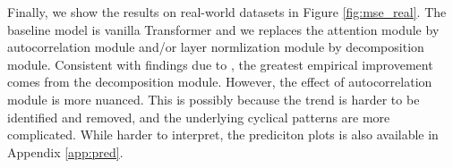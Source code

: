 Finally, we show the results on real-world datasets in Figure \ref{fig:mse_real}. 
The baseline model is vanilla Transformer and we replaces the attention module by autocorrelation module and/or layer normlization module by decomposition module. 
Consistent with findings due to \citet{https://doi.org/10.48550/arxiv.2106.13008}, the greatest empirical improvement comes from the decomposition module. 
However, the effect of autocorrelation module is more nuanced. 
This is possibly because the trend is harder to be identified and removed, and the underlying cyclical patterns are more complicated. 
While harder to interpret, the prediciton plots is also available in Appendix \ref{app:pred}. 

